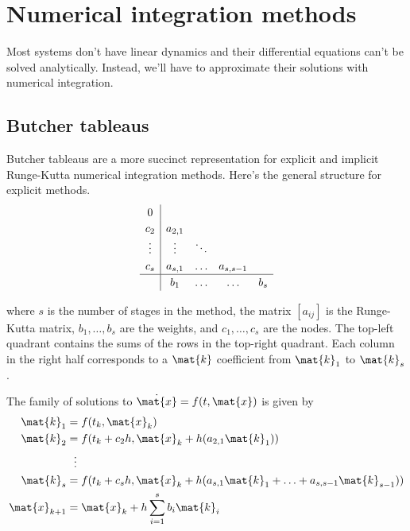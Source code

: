 \section{Numerical integration methods}
\label{sec:numerical_integration_methods}

Most systems don't have linear dynamics and their differential equations can't
be solved analytically. Instead, we'll have to approximate their solutions with
numerical integration.

\subsection{Butcher tableaus}

Butcher tableaus are a more succinct representation for explicit and implicit
Runge-Kutta numerical integration methods. Here's the general structure for
explicit methods.
\begin{equation*}
  \renewcommand\arraystretch{1.2}
  \begin{array}{c|cccc}
    0 \\
    c_2    & a_{2,1} \\
    \vdots & \vdots & \ddots \\
    c_s    & a_{s,1} & \hdots & a_{s,s-1} \\
    \hline
           & b_1    & \hdots & \hdots    & b_s
  \end{array}
\end{equation*}

where $s$ is the number of stages in the method, the matrix $[a_{ij}]$ is the
Runge-Kutta matrix, $b_1, \ldots, b_s$ are the weights, and $c_1, \ldots, c_s$
are the nodes. The top-left quadrant contains the sums of the rows in the
top-right quadrant. Each column in the right half corresponds to a $\mat{k}$
coefficient from $\mat{k}_1$ to $\mat{k}_s$.

The family of solutions to $\dot{\mat{x}} = f(t, \mat{x})$ is given by
\begin{align*}
  \mat{k}_1 &= f(t_k, \mat{x}_k) \\
  \mat{k}_2 &= f(t_k + c_2 h, \mat{x}_k + h (a_{2,1} \mat{k}_1)) \\
  &\ \ \vdots \\
  \mat{k}_s &= f(t_k + c_s h, \mat{x}_k +
    h (a_{s,1} \mat{k}_1 + \ldots + a_{s,s-1} \mat{k}_{s-1})) \\
  \mat{x}_{k+1} &= \mat{x}_k + h \sum_{i=1}^s b_i \mat{k}_i
\end{align*}

